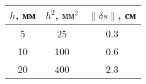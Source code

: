 \begin{tabular}{ccc}
\toprule
$h$, мм & $h^2$, $\text{мм}^2$ & $\| \delta s\|$, см \\
\midrule
5  & 25  & 0.3 \\
10 & 100 & 0.6 \\
20 & 400 & 2.3 \\
\bottomrule
\end{tabular}
